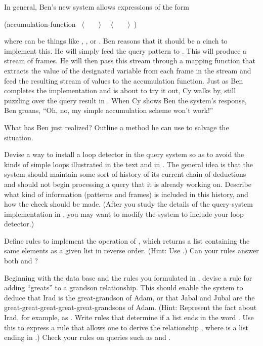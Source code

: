 \begin{exerciseGroup}
In general, Ben's new system allows expressions of the form

\begin{codeBlock}
(accumulation-function ~\(\langle \)~~~~\(\rangle \)~ ~\(\langle \)~~~~\(\rangle \)~)
\end{codeBlock}

\noindent
where  can be things like ,
, or .  Ben reasons that it should be a cinch to
implement this.  He will simply feed the query pattern to .  This
will produce a stream of frames.  He will then pass this stream through a
mapping function that extracts the value of the designated variable from each
frame in the stream and feed the resulting stream of values to the accumulation
function.  Just as Ben completes the implementation and is about to try it out,
Cy walks by, still puzzling over the  query result in
.  When Cy shows Ben the system's response, Ben groans,
``Oh, no, my simple accumulation scheme won't work!''

What has Ben just realized?  Outline a method he can use to salvage the
situation.

\label{Exercise 4.67}
 Devise a way to install a loop
detector in the query system so as to avoid the kinds of simple loops
illustrated in the text and in .
The general idea is that
the system should maintain some sort of history of its current chain of
deductions and should not begin processing a query that it is already working
on.  Describe what kind of information (patterns and frames) is included in
this history, and how the check should be made.  (After you study the details
of the query-system implementation in , you may want to
modify the system to include your loop detector.)

\label{Exercise 4.68}
 Define rules to implement the
 operation of , which returns a list
containing the same elements as a given list in reverse order.  (Hint: Use
.)  Can your rules answer both 
and  ?

\label{Exercise 4.69}
 Beginning with the data base and
the rules you formulated in , devise a rule for adding
``greats'' to a grandson relationship. This should enable the system to deduce
that Irad is the great-grandson of Adam, or that Jabal and Jubal are the
great-great-great-great-great-grandsons of Adam.  (Hint: Represent the fact
about Irad, for example, as .  Write rules
that determine if a list ends in the word .  Use this to express
a rule that allows one to derive the relationship , where  is a list ending in .)  Check your rules
on queries such as  and .
\end{exerciseGroup}

